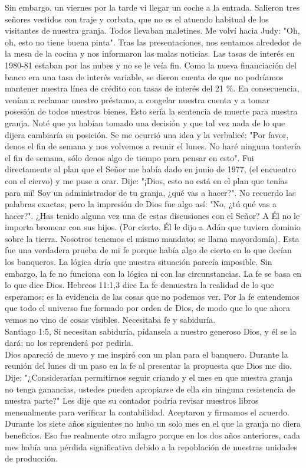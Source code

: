 \documentclass[twoside, 12pt]{book}
\begin{document}
Sin embargo, un viernes por la tarde vi llegar un coche a la entrada. Salieron tres señores vestidos con traje y corbata, que no es el atuendo habitual de los visitantes de nuestra granja. Todos llevaban maletines. Me volví hacia Judy: "Oh, oh, esto no tiene buena pinta". Tras las presentaciones, nos sentamos alrededor de la mesa de la cocina y nos informaron las malas noticias. Las tasas de interés en 1980-81 estaban por las nubes y no se le veía fin. Como la nueva financiación del banco era una tasa de interés variable, se dieron cuenta de que no podríamos mantener nuestra línea de crédito con tasas de interés del 21 \%. En consecuencia, venían a reclamar nuestro préstamo, a congelar nuestra cuenta y a tomar posesión de todos nuestros bienes. Esto sería la sentencia de muerte para nuestra granja. Noté que ya habían tomado una decisión y que tal vez nada de lo que dijera cambiaría su posición. Se me ocurrió una idea y la verbalicé: "Por favor, denos el fin de semana y nos volvemos a reunir el lunes. No haré ninguna tontería el fin de semana, sólo denos algo de tiempo para pensar en esto".
Fui directamente al plan que el Señor me había dado en junio de 1977, (el encuentro con el ciervo) y me puse a orar. Dije: "¡Dios, esto no está en el plan que tenías para mí! Soy un administrador de tu granja, ¿qué vas a hacer?". No recuerdo las palabras exactas, pero la impresión de Dios fue algo así: "No, ¿tú qué vas a hacer?". ¿Has tenido alguna vez una de estas discusiones con el Señor? A Él no le importa bromear con sus hijos. (Por cierto, Él le dijo a Adán que tuviera dominio sobre la tierra. Nosotros tenemos el mismo mandato; se llama mayordomía). Esta fue una verdadera prueba de mi fe porque había algo de cierto en lo que decían los banqueros. La lógica diría que nuestra situación parecía imposible. Sin embargo, la fe no funciona con la lógica ni con las circunstancias. La fe se basa en lo que dice Dios. Hebreos 11:1,3 dice La fe demuestra la realidad de lo que esperamos; es la evidencia de las cosas que no podemos ver. Por la fe entendemos que todo el universo fue formado por orden de Dios, de modo que lo que ahora vemos no vino de cosas visibles. Necesitaba fe y sabiduría.\\

Santiago 1:5, Si necesitan sabiduría, pídansela a nuestro generoso Dios, y él se la dará; no los reprenderá por pedirla.\\

Dios apareció de nuevo y me inspiró con un plan para el banquero. Durante la reunión del lunes di un paso en la fe al presentar la propuesta que Dios me dio. Dije: "¿Considerarían permitirnos seguir criando y el mes en que nuestra granja no tenga ganancias, ustedes pueden apropiarse de ella sin ninguna resistencia de nuestra parte?" Les dije que su contador podría revisar nuestros libros mensualmente para verificar la contabilidad. Aceptaron y firmamos el acuerdo. Durante los siete años siguientes no hubo un solo mes en el que la granja no diera beneficios. Eso fue realmente otro milagro porque en los dos años anteriores, cada mes había una pérdida significativa debido a la repoblación de nuestras unidades de producción.\\
\end{document}
